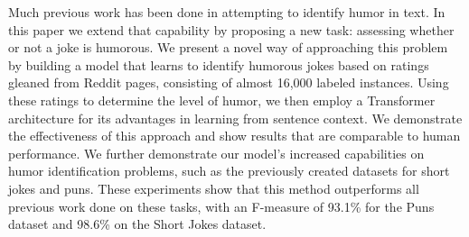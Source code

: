 Much previous work has been done in attempting to identify humor in text.  In this paper we extend that capability by proposing a new task: assessing whether or not a joke is humorous.  We present a novel way of approaching this problem by building a model that learns to identify humorous jokes based on ratings gleaned from Reddit pages, consisting of almost 16,000 labeled instances.  Using these ratings to determine the level of humor, we then employ a Transformer architecture for its advantages in learning from sentence context.  We demonstrate the effectiveness of this approach and show results that are comparable to human performance. We further demonstrate our model's increased capabilities on humor identification problems, such as the previously created datasets for short jokes and puns. These experiments show that this method outperforms all previous work done on these tasks, with an F-measure of 93.1\% for the Puns dataset and 98.6\% on the Short Jokes dataset.